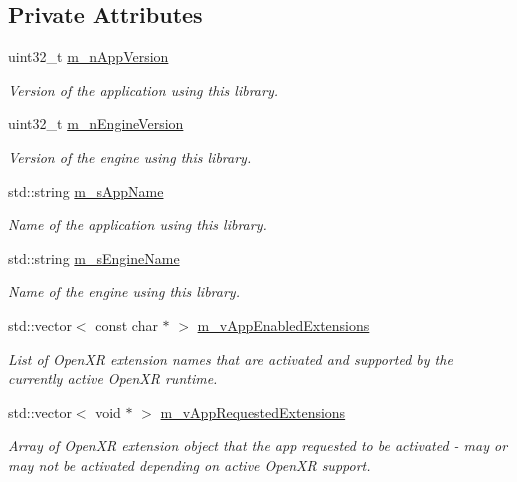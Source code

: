 \subsection*{Private Attributes}
\begin{DoxyCompactItemize}
\item 
uint32\+\_\+t \mbox{\hyperlink{class_open_x_r_provider_1_1_x_r_provider_aeede3bd8748b648cf9fd0d8527211047}{m\+\_\+n\+App\+Version}}
\begin{DoxyCompactList}\small\item\em Version of the application using this library. \end{DoxyCompactList}\item 
uint32\+\_\+t \mbox{\hyperlink{class_open_x_r_provider_1_1_x_r_provider_ae8ff1303046ba5c0f6e0d1e5e466198e}{m\+\_\+n\+Engine\+Version}}
\begin{DoxyCompactList}\small\item\em Version of the engine using this library. \end{DoxyCompactList}\item 
std\+::string \mbox{\hyperlink{class_open_x_r_provider_1_1_x_r_provider_a3683ac6e2def851431522ea4ba3cf784}{m\+\_\+s\+App\+Name}}
\begin{DoxyCompactList}\small\item\em Name of the application using this library. \end{DoxyCompactList}\item 
std\+::string \mbox{\hyperlink{class_open_x_r_provider_1_1_x_r_provider_afaa7e0d87fcb7349324328b07a96f8e8}{m\+\_\+s\+Engine\+Name}}
\begin{DoxyCompactList}\small\item\em Name of the engine using this library. \end{DoxyCompactList}\item 
std\+::vector$<$ const char $\ast$ $>$ \mbox{\hyperlink{class_open_x_r_provider_1_1_x_r_provider_a4d49ff8b8fbf41abcddadb833dc07008}{m\+\_\+v\+App\+Enabled\+Extensions}}
\begin{DoxyCompactList}\small\item\em List of Open\+XR extension names that are activated and supported by the currently active Open\+XR runtime. \end{DoxyCompactList}\item 
std\+::vector$<$ void $\ast$ $>$ \mbox{\hyperlink{class_open_x_r_provider_1_1_x_r_provider_a2e75834c9b96a31c762f95abe9e624dc}{m\+\_\+v\+App\+Requested\+Extensions}}
\begin{DoxyCompactList}\small\item\em Array of Open\+XR extension object that the app requested to be activated -\/ may or may not be activated depending on active Open\+XR support. \end{DoxyCompactList}\item 

\end{DoxyCompactItemize}
